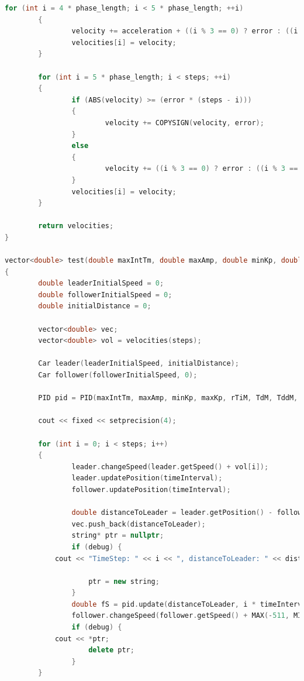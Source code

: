 \documentclass[a4paper,12pt]{article}
\begin{document}
\begin{lstlisting}[language=C++]
        for (int i = 4 * phase_length; i < 5 * phase_length; ++i)
        {
                velocity += acceleration + ((i % 3 == 0) ? error : ((i % 3 == 1) ? (-error) : 0));
                velocities[i] = velocity;
        }

        for (int i = 5 * phase_length; i < steps; ++i)
        {
                if (ABS(velocity) >= (error * (steps - i)))
                {
                        velocity += COPYSIGN(velocity, error);
                }
                else
                {
                        velocity += ((i % 3 == 0) ? error : ((i % 3 == 1) ? (-error) : 0));
                }
                velocities[i] = velocity;
        }

        return velocities;
}

vector<double> test(double maxIntTm, double maxAmp, double minKp, double maxKp, double rTiM, double TdM, double TddM, double eDPm, double eDPa, unsigned long session, double Kp, double preE = 0, unsigned long preT = 0, double timeInterval = 10, int steps = 50, bool debug = false)
{
        double leaderInitialSpeed = 0;
        double followerInitialSpeed = 0;
        double initialDistance = 0;

        vector<double> vec;
        vector<double> vol = velocities(steps);

        Car leader(leaderInitialSpeed, initialDistance);
        Car follower(followerInitialSpeed, 0);

        PID pid = PID(maxIntTm, maxAmp, minKp, maxKp, rTiM, TdM, TddM, eDPm, eDPa, session, Kp, preE, preT);

        cout << fixed << setprecision(4);

        for (int i = 0; i < steps; i++)
        {
                leader.changeSpeed(leader.getSpeed() + vol[i]);
                leader.updatePosition(timeInterval);
                follower.updatePosition(timeInterval);

                double distanceToLeader = leader.getPosition() - follower.getPosition();
                vec.push_back(distanceToLeader);
                string* ptr = nullptr;
                if (debug) {
            cout << "TimeStep: " << i << ", distanceToLeader: " << distanceToLeader << ", FollowerSpeed: " << follower.getSpeed() << ", LeaderSpeed: " << leader.getSpeed() << "\n";

                    ptr = new string;
                }
                double fS = pid.update(distanceToLeader, i * timeInterval, ptr);
                follower.changeSpeed(follower.getSpeed() + MAX(-511, MIN(fS, 511)));
                if (debug) {
            cout << *ptr;
                    delete ptr;
                }
        }


\end{lstlisting}
\end{document}
